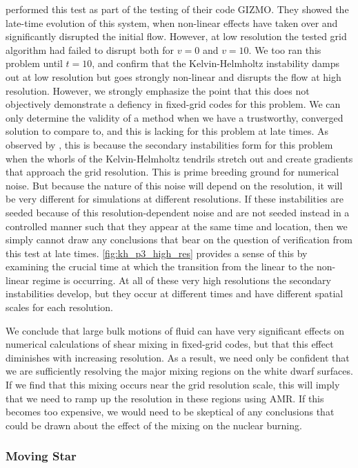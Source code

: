 \documentclass[iop]{../emulateapj}
\begin{document}
\citet{hopkins:2015} performed this test as part of the testing of their code GIZMO. 
They showed the late-time evolution of this system, when non-linear effects have 
taken over and significantly disrupted the initial flow. However, at low resolution the 
tested grid algorithm had failed to disrupt both for $v = 0$ and $v = 10$. We too ran 
this problem until $t = 10$, and confirm that the Kelvin-Helmholtz instability damps out 
at low resolution but goes strongly non-linear and disrupts the flow at high resolution.
However, we strongly emphasize the point that this does not objectively 
demonstrate a defiency in fixed-grid codes for this problem. We can only determine 
the validity of a method when we have a trustworthy, converged solution to compare to, and 
this is lacking for this problem at late times. As observed by \citeauthor{mcnally:2012}, 
this is because the secondary instabilities form for this problem when the whorls of 
the Kelvin-Helmholtz tendrils stretch out and create gradients that approach the 
grid resolution. This is prime breeding ground for numerical noise. But because 
the nature of this noise will depend on the resolution, it will be very different for 
simulations at different resolutions. If these instabilities are seeded because of 
this resolution-dependent noise and are not seeded instead in a controlled manner 
such that they appear at the same time and location, then we simply cannot draw 
any conclusions that bear on the question of verification from this test at late times. 
\autoref{fig:kh_p3_high_res} provides a sense of this by examining the crucial 
time at which the transition from the linear to the non-linear regime is occurring. 
At all of these very high resolutions the secondary instabilities develop, but they 
occur at different times and have different spatial scales for each resolution.

We conclude that large bulk motions of fluid can have very significant effects 
on numerical calculations of shear mixing in fixed-grid codes, but that this effect 
diminishes with increasing resolution. As a result, we need only be confident that we are 
sufficiently resolving the major mixing regions on the white dwarf surfaces. 
If we find that this mixing occurs near the grid resolution scale, this will imply 
that we need to ramp up the resolution in these regions using AMR. If this becomes 
too expensive, we would need to be skeptical of any conclusions that could be drawn 
about the effect of the mixing on the nuclear burning.

\subsubsection{Moving Star}\label{sec:moving_star}
\end{document}

